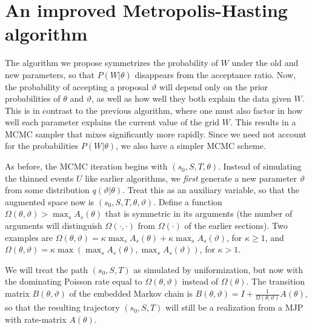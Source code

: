 \section{An improved Metropolis-Hasting algorithm}
The algorithm we propose symmetrizes the probability of $W$ under the old and new parameters, so that $P(W|\theta)$ disappears from the acceptance ratio. 
Now, the probability of accepting a proposal $\vartheta$ will depend only on the prior probabilities of $\theta$ and $\vartheta$, as well as how well they both explain the data given $W$.
This is in contrast to the previous algorithm, where one must also factor in how well each parameter explains the current value of the grid $W$.
This results in a MCMC sampler that mixes significantly more rapidly. 
Since we need not account for the probabilities $P(W|\theta)$, we also have a simpler MCMC scheme.

As before, the MCMC iteration begins with $(s_0, S, T, \theta)$. 
Instead of simulating the thinned events $U$ like earlier algorithms, we {\em first} generate a new parameter $\vartheta$ from some distribution $q(\vartheta|\theta)$. 
Treat this as an auxiliary variable, so that the augmented space now is $(s_0,S, T, \theta,\vartheta)$. 
Define a function $\Omega(\theta,\vartheta) > \max_s A_s(\theta)$ that is symmetric in its arguments (the number of arguments will distinguish $\Omega(\cdot,\cdot)$ from $\Omega(\cdot)$ of the earlier sections).
Two examples are $\Omega(\theta,\vartheta) = \kappa \max_s A_s(\theta) + \kappa \max_s A_s(\vartheta)$, for $\kappa \ge 1$, and 
$\Omega(\theta,\vartheta) = \kappa \max\left(\max_s A_s(\theta), \max_s A_s(\vartheta)\right)$, for $\kappa > 1$.


We will treat the path $(s_0,S,T)$ as simulated by  uniformization, but now with the dominating Poisson rate equal to $\Omega(\theta,\vartheta)$  instead of $\Omega(\theta)$. 
The transition matrix $B(\theta,\vartheta)$ of the embedded Markov chain is $B(\theta,\vartheta) = I + \frac{1}{\Omega(\theta,\vartheta)}A(\theta)$, so that the resulting trajectory $(s_0,S,T)$ will still be a realization from a MJP with rate-matrix $A(\theta)$.

